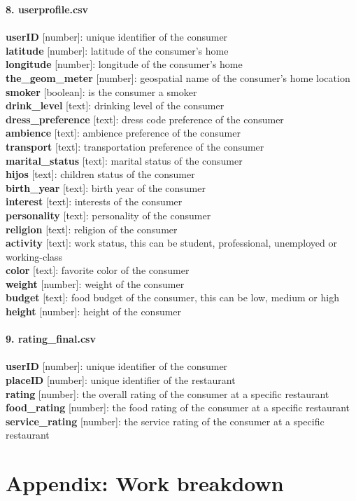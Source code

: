 \textbf{\large 8. userprofile.csv}\\
\\
\textbf{userID} [number]: unique identifier of the consumer\\
\textbf{latitude} [number]: latitude of the consumer's home\\
\textbf{longitude} [number]: longitude of the consumer's home\\
\textbf{the\_geom\_meter} [number]: geospatial name of the consumer's home location\\
\textbf{smoker} [boolean]: is the consumer a smoker\\
\textbf{drink\_level} [text]: drinking level of the consumer\\
\textbf{dress\_preference} [text]: dress code preference of the consumer\\
\textbf{ambience} [text]: ambience preference of the consumer\\
\textbf{transport} [text]: transportation preference of the consumer\\
\textbf{marital\_status} [text]: marital status of the consumer\\
\textbf{hijos} [text]: children status of the consumer\\
\textbf{birth\_year} [text]: birth year of the consumer\\
\textbf{interest} [text]: interests of the consumer\\
\textbf{personality} [text]: personality of the consumer\\
\textbf{religion} [text]: religion of the consumer\\
\textbf{activity} [text]: work status, this can be student, professional, unemployed or working-class\\
\textbf{color} [text]: favorite color of the consumer\\
\textbf{weight} [number]: weight of the consumer\\
\textbf{budget} [text]: food budget of the consumer, this can be low, medium or high\\
\textbf{height} [number]: height of the consumer\\
\\
\textbf{\large 9. rating\_final.csv}\\
\\
\textbf{userID} [number]: unique identifier of the consumer\\
\textbf{placeID} [number]: unique identifier of the restaurant\\
\textbf{rating} [number]: the overall rating of the consumer at a specific restaurant\\
\textbf{food\_rating} [number]: the food rating of the consumer at a specific restaurant\\
\textbf{service\_rating} [number]: the service rating of the consumer at a specific restaurant

\section{Appendix: Work breakdown}\label{app:appB}
